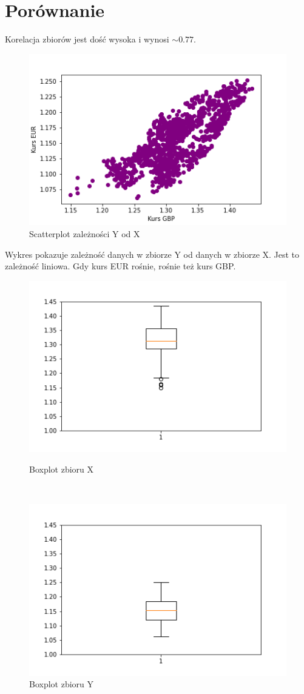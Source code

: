 \documentclass[12pt]{mwart}
\begin{document}
	\section{Porównanie}
	\noindent Korelacja zbiorów jest dość wysoka i wynosi $\sim 0.77$. 
	\begin{figure}[H]
		\centering
		\includegraphics[scale=0.7]{XY_sc.PNG}
		\caption{Scatterplot zależności Y od X}
	\end{figure}
	\noindent Wykres pokazuje zależność danych w zbiorze Y od danych w zbiorze X. Jest to zależność liniowa. Gdy kurs EUR rośnie, rośnie też kurs GBP.
	\begin{figure}[H]
		\begin{minipage}{.5\linewidth}
			\centering
			\includegraphics[scale=0.7]{X_box.PNG}
			\caption{Boxplot zbioru X}
		\end{minipage}
		$\quad$
		\begin{minipage}{.5\linewidth}
			\centering
			\includegraphics[scale=0.7]{Y_box.PNG}
			\caption{Boxplot zbioru Y}
		\end{minipage}
	\end{figure}
\end{document}
